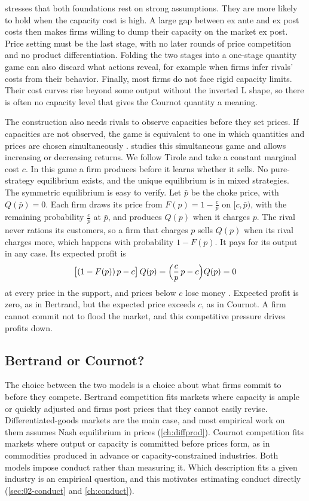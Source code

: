  \citet[sec.~5.3.4]{Tirole1988} stresses that both foundations rest on strong
assumptions. They are more likely to hold when the capacity cost is high. A large gap between ex ante and ex post
costs then makes firms willing to dump their capacity on the market ex post. Price setting must be the last stage,
with no later rounds of price competition and no product differentiation. Folding the two stages into a one-stage
quantity game can also discard what actions reveal, for example when firms infer rivals' costs from their behavior.
Finally, most firms do not face rigid capacity limits. Their cost curves rise beyond some output without the inverted
L shape, so there is often no capacity level that gives the Cournot quantity a meaning.

The construction also needs rivals to observe capacities before they set prices. If capacities are not observed,
the game is equivalent to one in which quantities and prices are chosen simultaneously
\citep[sec.~5.7.2.4]{Tirole1988}. \citet{Gertner1985} studies this simultaneous game and allows increasing or
decreasing returns. We follow Tirole and take a constant marginal cost $c$. In this game a firm produces before it
learns whether it sells. No pure-strategy equilibrium exists, and the unique equilibrium is in
mixed strategies. The symmetric equilibrium is easy to verify. Let $\bar p$ be the choke price, with $Q(\bar p) = 0$.
Each firm draws its price from $F(p) = 1 - \frac{c}{p}$ on $[c, \bar p)$, with the remaining probability
$\frac{c}{\bar p}$ at $\bar p$, and produces $Q(p)$ when it charges $p$. The rival never rations its customers, so
a firm that charges $p$ sells $Q(p)$ when its rival charges more, which happens with probability $1 - F(p)$. It pays
for its output in any case. Its expected profit is
\[
  \bigl[(1 - F(p))\,p - c\bigr]\,Q(p) = \Bigl(\frac{c}{p}\,p - c\Bigr)Q(p) = 0
\]
at every price in the support, and prices below $c$ lose money \citep[Exercise~5.9]{Tirole1988}. Expected profit is
zero, as in Bertrand, but the expected price exceeds $c$, as in Cournot. A firm cannot commit not to flood the
market, and this competitive pressure drives profits down.

\subsection{Bertrand or Cournot?}\label{sec:02-bertrand-vs-cournot}

The choice between the two models is a choice about what firms commit to before they compete. Bertrand competition
fits markets where capacity is ample or quickly adjusted and firms post prices that they cannot easily revise.
Differentiated-goods markets are the main case, and most empirical work on them assumes Nash equilibrium in prices
(\cref{ch:diffprod}). Cournot competition fits markets where output or capacity is committed before prices form, as
in commodities produced in advance or capacity-constrained industries. Both models impose conduct rather than
measuring it. Which description fits a given industry is an empirical question, and this motivates estimating
conduct directly (\cref{sec:02-conduct} and \cref{ch:conduct}).

